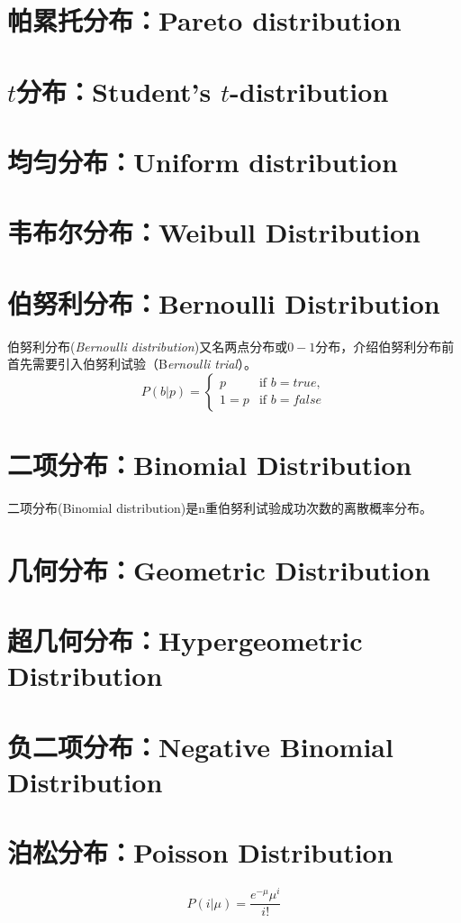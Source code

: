 \documentclass[11pt]{book}
\newcounter{#2}
\newcounter{#2}[#1]
\numberwithin{#2}{#1}
\begin{document}
		\section{帕累托分布：Pareto distribution}
		\section{$ t $分布：Student's $ t $-distribution}
		\section{均匀分布：Uniform distribution}
		\section{韦布尔分布：Weibull Distribution}
		
		\section{伯努利分布：Bernoulli Distribution}
			伯努利分布(\textit{Bernoulli distribution})又名两点分布或$ 0-1 $分布，介绍伯努利分布前首先需要引入伯努利试验（B\textit{ernoulli trial}）。
			\begin{equation}
				P(b|p)= \begin{cases}
					p & \text{if }  b =true,\\
					1=p & \text{if }   b =false
				\end{cases}
			\end{equation}
		
		\section{二项分布：Binomial Distribution}
			二项分布(Binomial distribution)是n重伯努利试验成功次数的离散概率分布。
		\section{几何分布：Geometric Distribution}
		\section{超几何分布：Hypergeometric Distribution}
		\section{负二项分布：Negative Binomial Distribution}
		\section{泊松分布：Poisson Distribution}
			\begin{equation}
				P(i|\mu)= \frac{e^{-\mu}\mu^{i}}{i!}
			\end{equation}
		
\end{document}
